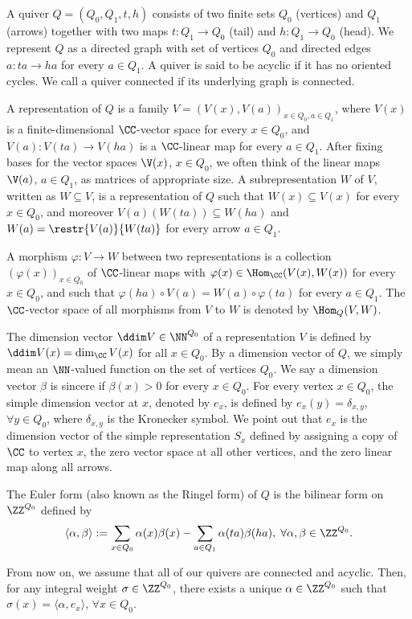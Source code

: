 A quiver $Q=(Q_0,Q_1,t,h)$ consists of two finite sets $Q_0$ (vertices) and $Q_1$ (arrows) together with two maps $t:Q_1 \to Q_0$ (tail) and $h:Q_1 \to Q_0$ (head). We represent $Q$ as a directed graph with set of vertices $Q_0$ and directed edges $a:ta \to ha$ for every $a \in Q_1$.  A quiver is said to be acyclic if it has no oriented cycles. We call a quiver connected if its underlying graph is connected.

A representation of $Q$ is a family $V=(V(x), V(a))_{x \in Q_0, a\in Q_1}$, where $V(x)$ is a finite-dimensional $\CC$-vector space for every $x \in Q_0$, and $V(a): V(ta) \to V(ha)$ is a $\CC$-linear map for every $a \in Q_1$. After fixing bases for the vector spaces $\V(x)$, $x \in Q_0$, we often think of the linear maps $\V(a)$, $a \in Q_1$, as matrices of appropriate size. A subrepresentation $W$ of $V$, written as $W \subseteq V$, is a representation of $Q$ such that $W(x) \subseteq V(x)$  for every $x \in Q_0$, and moreover $V(a)(W(ta)) \subseteq W(ha)$ and $W(a)=\restr{V(a)}{W(ta)}$ for every arrow $a \in Q_1$. 

A morphism $\varphi:V \rightarrow W$ between two representations is a collection $(\varphi(x))_{x \in Q_0}$ of $\CC$-linear maps with $\varphi(x) \in \Hom_{\CC}(V(x), W(x))$ for every $x \in Q_0$, and such that $\varphi(ha) \circ V(a)=W(a) \circ \varphi(ta)$ for every $a \in Q_1$. The $\CC$-vector space of all morphisms from $V$ to $W$ is denoted by $\Hom_Q(V, W)$.

The dimension vector $\ddim V \in \NN^{Q_0}$ of a representation $V$  is defined by $\ddim V(x)=\dim_\CC V(x)$ for all $x \in Q_0$. By a dimension vector of $Q$, we simply mean an $\NN$-valued function on the set of vertices $Q_0$. We say a dimension vector $\beta$ is sincere if $\beta(x)>0$ for every $x \in Q_0$. For every vertex $x \in Q_0$, the simple dimension vector at $x$, denoted by $e_x$, is defined by $e_x(y)=\delta_{x,y}$, $\forall y \in Q_0$, where $\delta_{x,y}$ is the Kronecker symbol. We point out that $e_x$ is the dimension vector of the simple representation $S_x$ defined by assigning a copy of $\CC$ to vertex $x$, the zero vector space at all other vertices, and the zero linear map along all arrows. 

The Euler form (also known as the Ringel form) of $Q$ is the bilinear form on $\ZZ^{Q_0}$ defined by
$$
\langle \alpha, \beta \rangle:=\sum_{x \in Q_0}\alpha(x)\beta(x)-\sum_{a \in Q_1} \alpha(ta)\beta(ha), \; \forall \alpha, \beta \in \ZZ^{Q_0}.
$$

From now on, we assume that all of our quivers are connected and acyclic. Then, for any integral weight $\sigma \in \ZZ^{Q_0}$, there exists a unique $\alpha \in \ZZ^{Q_0}$ such that $\sigma(x)=\langle \alpha, e_x \rangle$, $\forall x \in Q_0$. 

